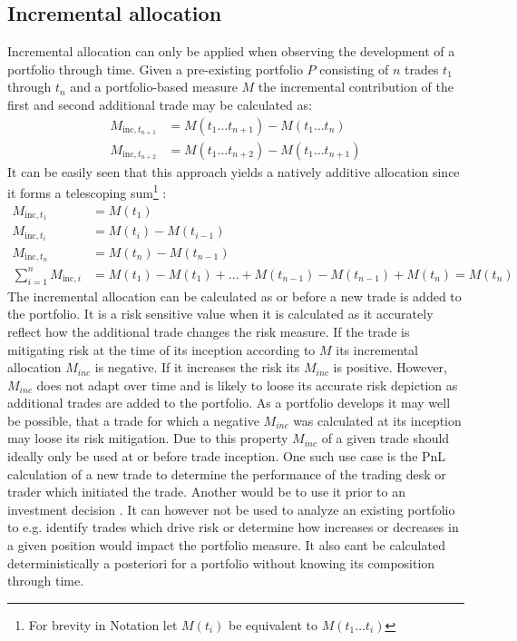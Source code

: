 \documentclass[../Thesis_AHoecherl.tex]{subfiles}
\begin{document}
\subsection{Incremental allocation\label{sec:Incremental alloaction}}
Incremental allocation can only be applied when observing the development of a portfolio through time. Given a pre-existing portfolio $P$ consisting of $n$ trades $t_1$ through $t_n$ and a portfolio-based measure $M$ the incremental contribution of the first and second additional trade may be calculated as:
\begin{align*}
M_{\text{inc},t_{n+1}} & =M\left(t_1\dots t_{n+1}\right)- M\left(t_1\dots t_{n}\right) \\
M_{\text{inc},t_{n+2}} & =M\left(t_1\dots t_{n+2}\right)- M\left(t_1\dots t_{n+1}\right)
\end{align*}
It can be easily seen that this approach yields a natively additive allocation since it forms a telescoping sum\footnote{For brevity in Notation let $M(t_i)$ be equivalent to $M(t_1\dots t_i)$ 
} :
\begin{align*}
M_{\text{inc},t_1}&=M(t_1) \\
M_{\text{inc},t_i}&= M(t_i)-M(t_{i-1}) \\
M_{\text{inc},t_n}&= M(t_n) - M(t_{n-1})\\
\sum_{i=1}^{n}{M_{\text{inc},i}} &= M(t_1)-M(t_1)+\dots+M(t_{n-1})-M(t_{n-1})+M(t_n) = M(t_n)
\end{align*}
The incremental allocation can be calculated as or before a new trade is added to the portfolio. It is a risk sensitive value when it is calculated as it accurately reflect how the additional trade changes the risk measure. 
If the trade is mitigating risk at the time of its inception according to $M$ its incremental allocation $M_{inc}$ is negative. If it increases the risk its $M_{inc}$ is positive. However, $M_{inc}$ does not adapt over time and is likely to loose its accurate risk depiction as additional trades are added to the portfolio. 
As a portfolio develops it may well be possible, that a trade for which a negative $M_{inc}$ was calculated at its inception may loose its risk mitigation. 
Due to this property $M_{inc}$ of a given trade should ideally only be used at or before trade inception. 
One such use case is the PnL calculation of a new trade to determine the performance of the trading desk or trader which initiated the trade. 
Another would be to use it prior to an investment decision \cite{tibiletti2001incremental}. 
It can however not be used to analyze an existing portfolio to e.g. identify trades which drive risk or determine how increases or decreases in a given position would impact the portfolio measure. 
It also cant be calculated deterministically a posteriori for a portfolio without knowing its composition through time.
\end{document}

